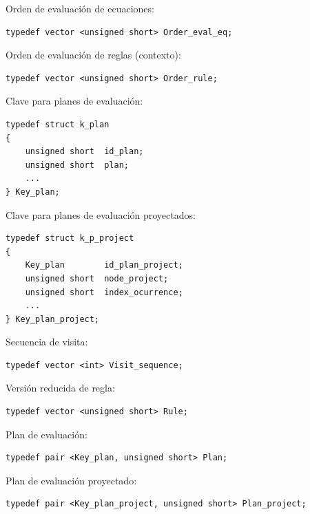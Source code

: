 \begin{items}
\item Orden de evaluación de ecuaciones:
\begin{lstlisting}[backgroundcolor=\color{white}, columns=fullflexible, linewidth=11.5cm]
typedef vector <unsigned short> Order_eval_eq;
\end{lstlisting}

\item Orden de evaluación de reglas (contexto):
\begin{lstlisting}[backgroundcolor=\color{white}, columns=fullflexible, linewidth=11.5cm]
typedef vector <unsigned short> Order_rule;
\end{lstlisting}

\item Clave para planes de evaluación:
\begin{lstlisting}[backgroundcolor=\color{white}, columns=fullflexible, linewidth=11.5cm]
typedef struct k_plan
{
    unsigned short  id_plan;
    unsigned short  plan;
    ...
} Key_plan;
\end{lstlisting}

\item Clave para planes de evaluación proyectados:
\begin{lstlisting}[backgroundcolor=\color{white}, columns=fullflexible, linewidth=11.5cm]
typedef struct k_p_project
{
    Key_plan        id_plan_project;
    unsigned short  node_project;
    unsigned short  index_ocurrence;
    ...
} Key_plan_project;
\end{lstlisting}

\item Secuencia de visita:
\begin{lstlisting}[backgroundcolor=\color{white}, columns=fullflexible, linewidth=11.5cm]
typedef vector <int> Visit_sequence;
\end{lstlisting}

\item Versión reducida de regla:
\begin{lstlisting}[backgroundcolor=\color{white}, columns=fullflexible, linewidth=11.5cm]
typedef vector <unsigned short> Rule;
\end{lstlisting}

\item Plan de evaluación:
\begin{lstlisting}[backgroundcolor=\color{white}, columns=fullflexible, linewidth=11.5cm]
typedef pair <Key_plan, unsigned short> Plan;
\end{lstlisting}

\item Plan de evaluación proyectado:
\begin{lstlisting}[backgroundcolor=\color{white}, columns=fullflexible, linewidth=11.5cm]
typedef pair <Key_plan_project, unsigned short> Plan_project;
\end{lstlisting}
\end{items}

\normalsize
